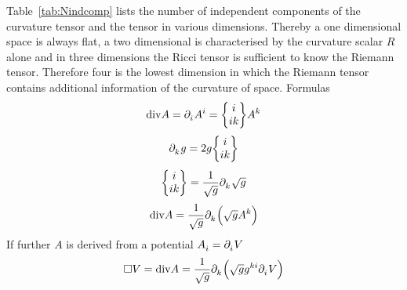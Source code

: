 Table~\ref{tab:Nindcomp} lists the number of independent components of the
curvature tensor and the  tensor in various dimensions. Thereby a
one dimensional space is always flat, a two dimensional is characterised by the
curvature scalar $R$ alone and in three dimensions the Ricci tensor is
sufficient to know the Riemann tensor. Therefore four is the lowest dimension in
which the Riemann tensor contains additional information of the curvature of
space.
Formulas 
\begin{equation}
\mathrm{div} A=\tensor{\partial}{_i}\tensor{A}{^i}=\cSym{i}{i}{k}\tensor{A}{^k}
\end{equation}
\begin{equation}
\tensor{\partial}{_k}g=2g\cSym{i}{i}{k}
\end{equation}
\begin{equation}
\cSym{i}{i}{k}=\frac{1}{\sqrt{g}}\tensor{\partial}{_k}\sqrt{g}
\end{equation}
\begin{equation}
\mathrm{div}
A=\frac{1}{\sqrt{g}}\tensor{\partial}{_k}\left(\sqrt{g}\tensor{A}{^k}\right)
\end{equation}
If further $A$ is derived from a potential
$\tensor{A}{_i}=\tensor{\partial}{_i}V$
\begin{equation}
\square V
=\mathrm{div}A
=\frac{1}{\sqrt{g}}\tensor{\partial}{_k}\left(\sqrt{g}\tensor{g}{^k^i}\tensor{\partial}{_i}V\right)\label{eq:quabla}
\end{equation}
